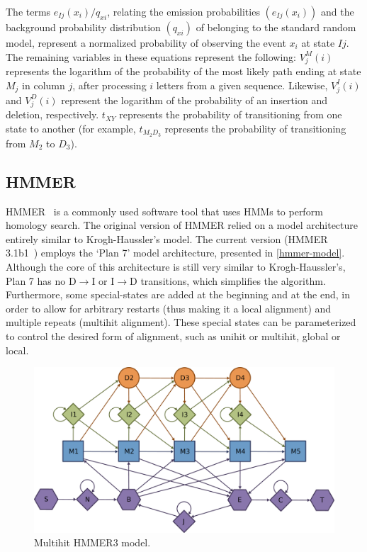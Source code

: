 \documentclass{bmcart}
\begin{document}

The terms $e_{Ij}(x_i)/q_{xi}$, relating the emission probabilities $(e_{Ij}(x_i))$ and the background probability distribution $(q_{xi})$ of belonging to the standard random model, represent a normalized probability of observing the event $x_i$ at state $Ij$. The remaining variables in these equations represent the following: $V^M_j(i)$ represents the logarithm of the probability of the most likely path  ending at state $M_j$ in column $j$, after processing $i$ letters from a given sequence. Likewise, $V^I_j(i)$ and $V^D_j(i)$ represent the logarithm of the probability of an insertion and deletion, respectively. $t_{XY}$ represents the probability of transitioning from one state to another (for example, $t_{M_{2} D_3}$ represents the probability of transitioning from $M_{2}$ to $D_3$). 

\subsection*{HMMER}

HMMER~\cite{eddy1998profile} is a commonly used software tool that uses \acp{HMM} to perform homology search. The original version of HMMER relied on a model architecture entirely similar to Krogh-Haussler's model. The current version (HMMER 3.1b1~\cite{eddy2011hmmer3}) employs the `Plan 7' model architecture, presented in \autoref{hmmer-model}. Although the core of this architecture is still very similar to Krogh-Haussler's, Plan 7 has no $\mathrm{D}\rightarrow\mathrm{I}$ or $\mathrm{I}\rightarrow\mathrm{D}$ transitions, which simplifies the algorithm. Furthermore, some special-states are added at the beginning and at the end, in order to allow for arbitrary restarts (thus making it a local alignment) and multiple repeats (multihit alignment). These special states can be parameterized to control the desired form of alignment, such as unihit or multihit, global or local.

\begin{figure}[h!]
  \centering
  \includegraphics{img/hmmer-model.eps}
  \caption{Multihit HMMER3 model.}
  \label{hmmer-model}
\end{figure}
\end{document}
